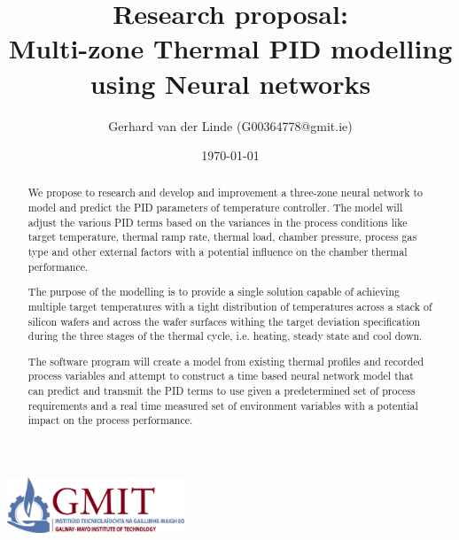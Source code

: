 

\title{Research proposal: \\ Multi-zone Thermal PID modelling using Neural networks}
\author{Gerhard van der Linde (G00364778@gmit.ie)}
\date{\today}



  \maketitle
  \begin{center}
  \includegraphics[width=200px]{img/gmit-logo.jpg}
  \end{center}

  \begin{abstract}
    We propose to research and develop and improvement a three-zone neural
    network to model and predict the PID parameters of temperature controller. 
    The model will adjust the various PID terms based on the variances in the 
    process conditions like target temperature, thermal ramp rate, thermal load, 
    chamber pressure, process gas type and other external factors with a 
    potential influence on the chamber thermal performance.

    The purpose of the modelling is to provide a single solution capable of 
    achieving multiple target temperatures with a tight distribution of 
    temperatures across a stack of silicon wafers and across the wafer 
    surfaces withing the target deviation specification during the three stages 
    of the thermal cycle, i.e. heating, steady state and cool down.   
    
    The software program will create a model from existing thermal profiles and 
    recorded process variables and attempt to construct a time based neural network 
    model that can predict and transmit the PID terms to use given a predetermined 
    set of process requirements and a real time measured set of environment variables
    with a potential impact on the process performance.

  \end{abstract}

